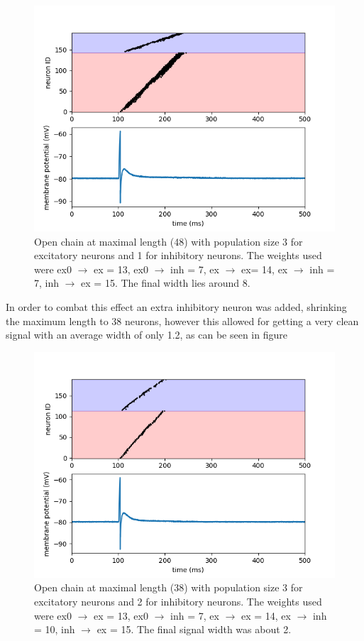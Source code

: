 \documentclass[10pt,a4paper]{article}
\begin{document}
\begin{figure}
    \centering
    \includegraphics[width=\textwidth]{figures/feedforward-open.png}
    \caption{Open chain at maximal length (48) with population size 3 for
    excitatory neurons and 1 for inhibitory neurons. The weights used were ex0
    $\rightarrow$ ex = 13, ex0 $\rightarrow$ inh = 7, ex $\rightarrow$ ex= 14,
    ex $\rightarrow$ inh = 7, inh $\rightarrow$ ex = 15. The final width lies around
    8.}
    \label{fig:ff-open-3-1}
\end{figure}

In order to combat this effect an extra inhibitory neuron was added, shrinking
the maximum length to 38 neurons, however this allowed for getting a very clean
signal with an average width of only 1.2, as can be seen in figure

\begin{figure}
    \centering
    \includegraphics[width=\textwidth]{figures/feedforward-open-better.png}
    \caption{Open chain at maximal length (38) with population size 3 for
    excitatory neurons and 2 for inhibitory neurons. The weights used were
    ex0 $\rightarrow$ ex = 13, ex0 $\rightarrow$ inh = 7, ex $\rightarrow$ ex =
    14, ex $\rightarrow$ inh = 10, inh $\rightarrow$ ex = 15. The final signal width
    was about 2.}
    \label{fig:ff-open-3-2}
\end{figure}
\end{document}
